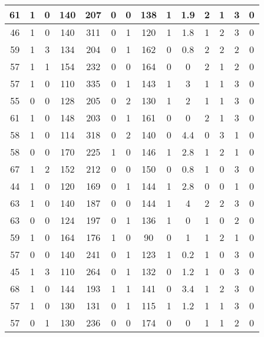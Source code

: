 \documentclass{article}
\begin{document}
\begin{longtable}{|c|c|c|c|c|c|c|c|c|c|c|c|c|c|}
\hline
61 & 1 & 0 & 140 & 207 & 0 & 0 & 138 & 1 & 1.9 & 2 & 1 & 3 & 0\\
\hline
46 & 1 & 0 & 140 & 311 & 0 & 1 & 120 & 1 & 1.8 & 1 & 2 & 3 & 0\\
\hline
59 & 1 & 3 & 134 & 204 & 0 & 1 & 162 & 0 & 0.8 & 2 & 2 & 2 & 0\\
\hline
57 & 1 & 1 & 154 & 232 & 0 & 0 & 164 & 0 & 0 & 2 & 1 & 2 & 0\\
\hline
57 & 1 & 0 & 110 & 335 & 0 & 1 & 143 & 1 & 3 & 1 & 1 & 3 & 0\\
\hline
55 & 0 & 0 & 128 & 205 & 0 & 2 & 130 & 1 & 2 & 1 & 1 & 3 & 0\\
\hline
61 & 1 & 0 & 148 & 203 & 0 & 1 & 161 & 0 & 0 & 2 & 1 & 3 & 0\\
\hline
58 & 1 & 0 & 114 & 318 & 0 & 2 & 140 & 0 & 4.4 & 0 & 3 & 1 & 0\\
\hline
58 & 0 & 0 & 170 & 225 & 1 & 0 & 146 & 1 & 2.8 & 1 & 2 & 1 & 0\\
\hline
67 & 1 & 2 & 152 & 212 & 0 & 0 & 150 & 0 & 0.8 & 1 & 0 & 3 & 0\\
\hline
44 & 1 & 0 & 120 & 169 & 0 & 1 & 144 & 1 & 2.8 & 0 & 0 & 1 & 0\\
\hline
63 & 1 & 0 & 140 & 187 & 0 & 0 & 144 & 1 & 4 & 2 & 2 & 3 & 0\\
\hline
63 & 0 & 0 & 124 & 197 & 0 & 1 & 136 & 1 & 0 & 1 & 0 & 2 & 0\\
\hline
59 & 1 & 0 & 164 & 176 & 1 & 0 & 90 & 0 & 1 & 1 & 2 & 1 & 0\\
\hline
57 & 0 & 0 & 140 & 241 & 0 & 1 & 123 & 1 & 0.2 & 1 & 0 & 3 & 0\\
\hline
45 & 1 & 3 & 110 & 264 & 0 & 1 & 132 & 0 & 1.2 & 1 & 0 & 3 & 0\\
\hline
68 & 1 & 0 & 144 & 193 & 1 & 1 & 141 & 0 & 3.4 & 1 & 2 & 3 & 0\\
\hline
57 & 1 & 0 & 130 & 131 & 0 & 1 & 115 & 1 & 1.2 & 1 & 1 & 3 & 0\\
\hline
57 & 0 & 1 & 130 & 236 & 0 & 0 & 174 & 0 & 0 & 1 & 1 & 2 & 0\\
\hline
\end{longtable}
\end{document}
